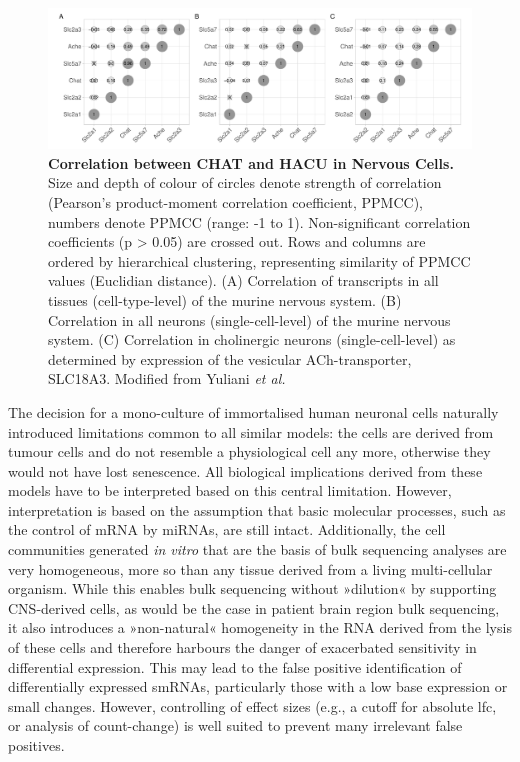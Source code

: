 \begin{figure}
\includegraphics[width=\textwidth]{figures/chat-hacu-corr}
\caption[Correlation between CHAT and HACU in Nervous Cells.]{\textbf{Correlation between CHAT and HACU in Nervous Cells.} Size and depth of colour of circles denote strength of correlation (Pearson’s product-moment correlation coefficient, PPMCC), numbers denote PPMCC (range: -1 to 1). Non-significant correlation coefficients (p > 0.05) are crossed out. Rows and columns are ordered by hierarchical clustering, representing similarity of PPMCC values (Euclidian distance). (A) Correlation of transcripts in all tissues (cell-type-level) of the murine nervous system. (B) Correlation in all neurons (single-cell-level) of the murine nervous system. (C) Correlation in cholinergic neurons (single-cell-level) as determined by expression of the vesicular ACh-transporter, SLC18A3. Modified from Yuliani \emph{et al.}\cite{Yuliani2020}
\label{fig:chat-hacu-corr}}
\end{figure}

The decision for a mono-culture of immortalised human neuronal cells naturally introduced limitations common to all similar models: the cells are derived from tumour cells and do not resemble a physiological cell any more, otherwise they would not have lost senescence. All biological implications derived from these models have to be interpreted based on this central limitation. However, interpretation is based on the assumption that basic molecular processes, such as the control of mRNA by miRNAs, are still intact. Additionally, the cell communities generated \emph{in vitro} that are the basis of bulk sequencing analyses are very homogeneous, more so than any tissue derived from a living multi-cellular organism. While this enables bulk sequencing without »dilution« by supporting CNS-derived cells, as would be the case in patient brain region bulk sequencing, it also introduces a »non-natural« homogeneity in the RNA derived from the lysis of these cells and therefore harbours the danger of exacerbated sensitivity in differential expression. This may lead to the false positive identification of differentially expressed smRNAs, particularly those with a low base expression or small changes. However, controlling of effect sizes (e.g., a cutoff for absolute \acl{lfc}, or analysis of count-change) is well suited to prevent many irrelevant false positives.


